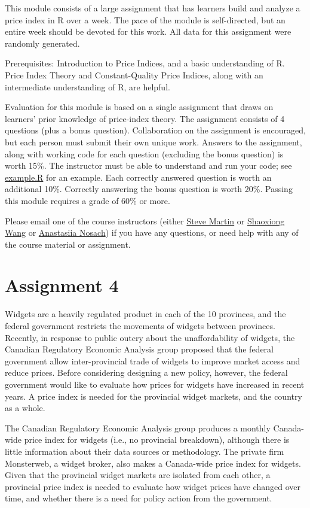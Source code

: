 \documentclass[
]{article}
\begin{document}
This module consists of a large assignment that has learners build and analyze a price index in R over a week. The pace of the module is self-directed, but an entire week should be devoted for this work. All data for this assignment were randomly generated.

Prerequisites: Introduction to Price Indices, and a basic understanding of R. Price Index Theory and Constant-Quality Price Indices, along with an intermediate understanding of R, are helpful.

Evaluation for this module is based on a single assignment that draws on learners' prior knowledge of price-index theory. The assignment consists of 4 questions (plus a bonus question). Collaboration on the assignment is encouraged, but each person must submit their own unique work. Answers to the assignment, along with working code for each question (excluding the bonus question) is worth 15\%. The instructor must be able to understand and run your code; see \href{scripts/example.R}{example.R} for an example. Each correctly answered question is worth an additional 10\%. Correctly answering the bonus question is worth 20\%. Passing this module requires a grade of 60\% or more.

Please email one of the course instructors (either \href{mailto:steve.martin5@canada.ca}{Steve Martin} or \href{mailto:shaoxiong.wang@canada.ca}{Shaoxiong Wang} or \href{mailto:anastasiia.nosach@canada.ca}{Anastasiia Nosach}) if you have any questions, or need help with any of the course material or assignment.

\hypertarget{assignment-4}{%
\section{Assignment 4}\label{assignment-4}}

Widgets are a heavily regulated product in each of the 10 provinces, and the federal government restricts the movements of widgets between provinces. Recently, in response to public outcry about the unaffordability of widgets, the Canadian Regulatory Economic Analysis group proposed that the federal government allow inter-provincial trade of widgets to improve market access and reduce prices. Before considering designing a new policy, however, the federal government would like to evaluate how prices for widgets have increased in recent years. A price index is needed for the provincial widget markets, and the country as a whole.

The Canadian Regulatory Economic Analysis group produces a monthly Canada-wide price index for widgets (i.e., no provincial breakdown), although there is little information about their data sources or methodology. The private firm Monsterweb, a widget broker, also makes a Canada-wide price index for widgets. Given that the provincial widget markets are isolated from each other, a provincial price index is needed to evaluate how widget prices have changed over time, and whether there is a need for policy action from the government.
\end{document}
